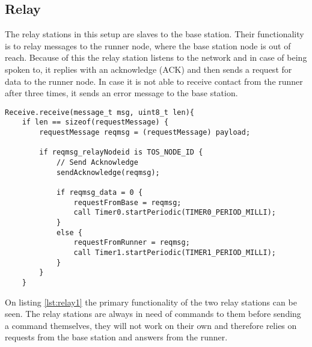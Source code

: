 \subsection{Relay}\label{sc:relay}
The relay stations in this setup are slaves to the base station. Their functionality is to relay messages to the runner node, where the base station node is out of reach. Because of this the relay station listens to the network and in case of being spoken to, it replies with an acknowledge (ACK) and then sends a request for data to the runner node. In case it is not able to receive contact from the runner after three times, it sends an error message to the base station.

\begin{minipage}[t]{0.95\linewidth}
	\begin{lstlisting}[caption=Receive message event of Relay., label={lst:relay1}]
	Receive.receive(message_t msg, uint8_t len){
	if len == sizeof(requestMessage) {
		requestMessage reqmsg = (requestMessage) payload;
		
		if reqmsg_relayNodeid is TOS_NODE_ID {
			// Send Acknowledge
			sendAcknowledge(reqmsg);
			
			if reqmsg_data = 0 {	
				requestFromBase = reqmsg;
				call Timer0.startPeriodic(TIMER0_PERIOD_MILLI);		
			}
			else {
				requestFromRunner = reqmsg;
				call Timer1.startPeriodic(TIMER1_PERIOD_MILLI);
			}
		}
	}
	\end{lstlisting}
\end{minipage}

\noindent On listing \ref{lst:relay1} the primary functionality of the two relay stations can be seen. The relay stations are always in need of commands to them before sending a command themselves, they will not work on their own and therefore relies on requests from the base station and answers from the runner.